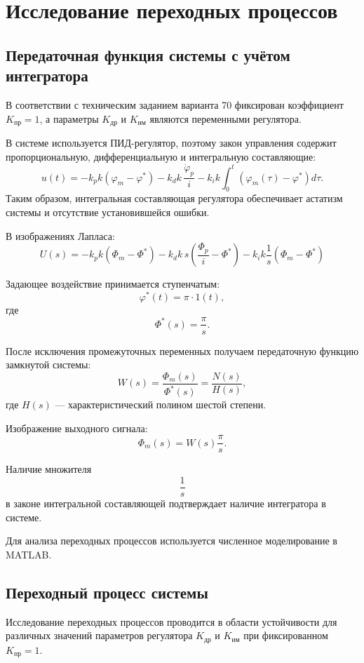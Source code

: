 \documentclass[a4paper, 14pt]{extarticle}
\begin{document}
\section{Исследование переходных процессов}

\subsection{Передаточная функция системы с учётом интегратора}

В соответствии с техническим заданием варианта 70 фиксирован коэффициент
$K_{\text{пр}}=1$, а параметры $K_{\text{др}}$ и $K_{\text{им}}$ являются
переменными регулятора.

В системе используется ПИД-регулятор, поэтому закон управления содержит пропорциональную, дифференциальную и интегральную составляющие:
\[
    u(t)=
    -k_p k\left(\varphi_m-\varphi^*\right)
    -k_d k\,\frac{\dot{\varphi}_p}{i}
    -k_i k\int_0^t\left(\varphi_m(\tau)-\varphi^*\right)d\tau.
\]
Таким образом, интегральная составляющая регулятора обеспечивает астатизм системы и отсутствие установившейся ошибки.

В изображениях Лапласа:
\[
    U(s)=
    -k_pk(\Phi_m-\Phi^*)
    -k_dk\,s
    \left(
    \frac{\Phi_p}{i}
    -\Phi^*
    \right)
    -k_ik
    \frac{1}{s}
    (\Phi_m-\Phi^*)
\]

Задающее воздействие принимается ступенчатым:
\[
    \varphi^*(t)=\pi\cdot1(t),
\]
где
\[
    \Phi^*(s)=\frac{\pi}{s}.
\]

После исключения промежуточных переменных получаем передаточную функцию замкнутой системы:
\[
    W(s)=
    \frac{\Phi_m(s)}{\Phi^*(s)}
    =
    \frac{N(s)}{H(s)},
\]
где \(H(s)\) — характеристический полином шестой степени.

Изображение выходного сигнала:
\[
    \Phi_m(s)=
    W(s)\frac{\pi}{s}.
\]

Наличие множителя
\[
    \frac{1}{s}
\]
в законе интегральной составляющей подтверждает наличие интегратора в системе.

Для анализа переходных процессов используется численное моделирование в MATLAB.

\subsection{Переходный процесс системы}

Исследование переходных процессов проводится в области устойчивости
для различных значений параметров регулятора $K_{\text{др}}$ и $K_{\text{им}}$
при фиксированном $K_{\text{пр}}=1$.
\end{document}
